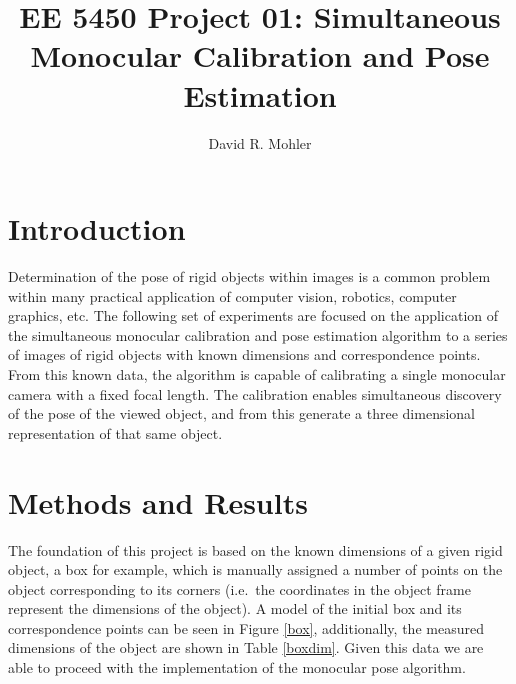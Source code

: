 \documentclass[12pt]{article}
\begin{document}
\title{EE 5450  Project 01: Simultaneous Monocular Calibration and Pose Estimation}

\author{David R. Mohler}


\maketitle

\section{Introduction} 
Determination of the pose of rigid objects within images is a common problem within many practical application of computer vision, robotics, computer graphics, etc. The following set of experiments are focused on the application of the simultaneous monocular calibration and pose estimation algorithm to a series of images of rigid objects with known dimensions and correspondence points. From this known data, the algorithm is capable of calibrating a single monocular camera with a fixed focal length. The calibration enables simultaneous discovery of the pose of the viewed object, and from this generate a three dimensional representation of that same object.  

\section{Methods and Results}
The foundation of this project is based on the known dimensions of a given rigid object, a box for example, which is  manually assigned a number of points on the object corresponding to its corners (i.e.\ the coordinates in the object frame represent the dimensions of the object). A model of the initial box and its correspondence points can be seen in Figure \ref{box}, additionally, the measured dimensions of the object are shown in Table \ref{boxdim}. Given this data we are able to proceed with the implementation of the monocular pose algorithm. 
\end{document}
